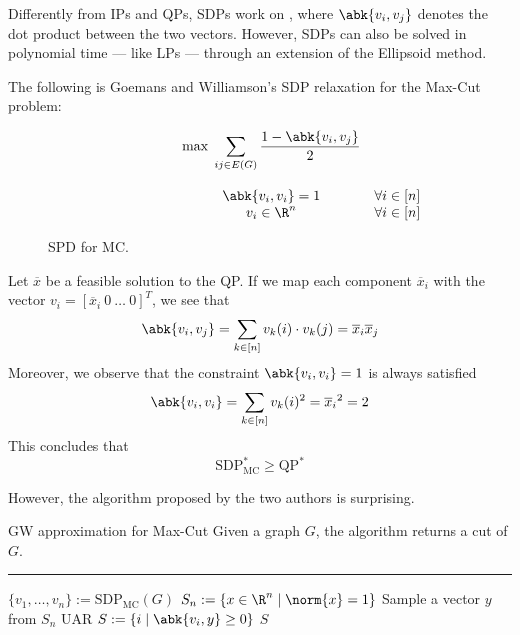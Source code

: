 \documentclass[a4paper, 12pt]{report}
\begin{document}
    Differently from IPs and QPs, SDPs work on , where $\abk{v_i, v_j}$ denotes the dot product between the two vectors. However, SDPs can also be solved in polynomial time --- like LPs --- through an extension of the Ellipsoid method.

    The following is Goemans and Williamson's SDP relaxation for the Max-Cut problem:

    \begin{figure}[H]
        \centering
        \[\begin{array}{ccl}
            \qquad\qquad\quad
            & \max \; \displaystyle \sum_{ij \in E(G)}{\dfrac{1 - \abk{v_i, v_j}}{2}} \\\\
            & \abk{v_i, v_i} = 1 & \forall i \in [n] \\
            & v_i \in \R^n & \forall i \in [n] \\
        \end{array}\]
        \caption{SPD for MC.}
    \end{figure}

    Let $\overline x$ be a feasible solution to the QP. If we map each component $\overline x_i$ with the vector $v_i = [\overline x_i \ 0 \ \ldots \ 0]^T$, we see that $$\abk{v_i, v_j} = \sum_{k \in [n]}{v_{k}(i) \cdot v_k(j)} = \overline x_i \overline x_j$$ Moreover, we observe that  the constraint $\abk{v_i, v_i} = 1$ is always satisfied $$\abk{v_i, v_i} = \sum_{k \in [n]}{v_k(i)^2} = {\overline x_i}^2 = 2$$ This concludes that $$\mathrm{SDP}^*_\mathrm{MC} \ge \mathrm{QP}^*$$

    However, the algorithm proposed by the two authors is  surprising.

    \begin{framedalgo}[label={gw algo}]{GW approximation for Max-Cut}
        Given a graph $G$, the algorithm returns a cut of $G$. \\
        \hrule

        \quad
        \begin{algorithmic}[1]
                \State $\{v_1, \ldots, v_n\} := \mathrm{SDP}_\mathrm{MC}(G)$
                \State $S_n := \{x \in \R^n \mid \norm{x} = 1\}$ 
                \State Sample a vector $y$ from $S_n$ UAR
                \State $S := \{i \mid \abk{v_i, y} \ge 0\}$
                \State {} $S$
            \EndFunction
        \end{algorithmic}
    \end{framedalgo}
\end{document}
